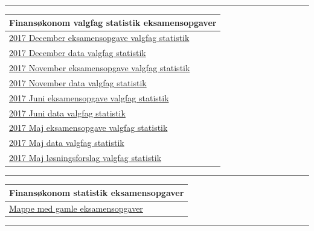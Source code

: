 \documentclass[]{book}
\begin{document}
\begin{center}\rule{0.5\linewidth}{\linethickness}\end{center}

\begin{longtable}[]{@{}l@{}}
\toprule
Finansøkonom valgfag statistik eksamensopgaver\tabularnewline
\midrule
\endhead
\href{https://www.dropbox.com/s/lpiglled5qdmtjh/2017\%20December\%20eksamensopgave\%20valgfag\%20statistik.pdf?dl=1}{2017 December eksamensopgave valgfag statistik}\tabularnewline
\href{https://www.dropbox.com/s/ki9mpbsn8jak84i/2017\%20December\%20-\%20Data.xlsx?dl=1}{2017 December data valgfag statistik}\tabularnewline
\href{https://www.dropbox.com/s/3wwbnvyxdz5z04h/2017\%20November\%20eksamensopgave\%20valgfag\%20statistik.pdf?dl=1}{2017 November eksamensopgave valgfag statistik}\tabularnewline
\href{https://www.dropbox.com/s/nqqyc5puaqjuoo7/2017\%20November\%20valgfag\%20statistik\%20-\%20Erstatninger.xlsx?dl=1}{2017 November data valgfag statistik}\tabularnewline
\href{https://www.dropbox.com/s/hc44wglho5tccgs/2017\%20Juni\%20eksamensopgave\%20valgfag\%20statistik.pdf?dl=1}{2017 Juni eksamensopgave valgfag statistik}\tabularnewline
\href{https://www.dropbox.com/s/73azkke4vnduzbk/2017\%20Juni\%20Data\%20-\%20Billeasing.xlsx?dl=1}{2017 Juni data valgfag statistik}\tabularnewline
\href{https://www.dropbox.com/s/psnsb67bw4v98a7/2017\%20Maj\%20eksamensopgave\%20valgfag\%20statistk.pdf?dl=1}{2017 Maj eksamensopgave valgfag statistik}\tabularnewline
\href{https://www.dropbox.com/s/7wpcnkdrjs9tetl/2017\%20Maj\%20Bank.xlsx?dl=1}{2017 Maj data valgfag statistik}\tabularnewline
\href{https://www.dropbox.com/s/4z84mj0mvx4xrql/2017\%20Maj\%20Valgfag\%2C\%20statistik\%20-\%20l\%C3\%B8sning.docx?dl=1}{2017 Maj løsningsforslag valgfag statistik}\tabularnewline
\bottomrule
\end{longtable}

\begin{center}\rule{0.5\linewidth}{\linethickness}\end{center}

\begin{longtable}[]{@{}l@{}}
\toprule
Finansøkonom statistik eksamensopgaver\tabularnewline
\midrule
\endhead
\href{https://drive.google.com/drive/folders/0B1E7VnhxsDMlUTJXLWowYjFNTzg?usp=sharing}{Mappe med gamle eksamensopgaver}\tabularnewline
\bottomrule
\end{longtable}

\begin{center}\rule{0.5\linewidth}{\linethickness}\end{center}
\end{document}
